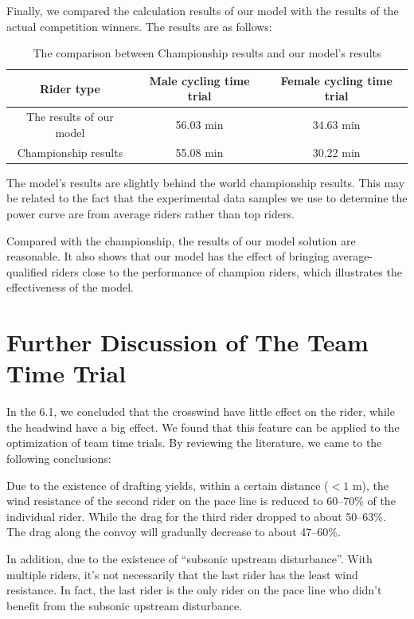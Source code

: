 \documentclass{mcmthesis}
\begin{document}
Finally, we compared the calculation results of our model with the results of the actual competition
winners. The results are as follows:
\begin{table}[H]
\centering
\caption{The comparison between Championship results and our model's results}
\label{tab:11}\vspace{-0.4cm}
\begin{tabular}{ccc}
\hline
Rider type & Male cycling time trial & Female cycling time trial \\
\hline
The results of our model & 56.03 min & 34.63 min \\
Championship results & 55.08 min & 30.22 min \\
\hline
\end{tabular}
\end{table}
\vspace{-0.4cm}
The model's results are slightly behind the world championship
 results. This may be related to the fact that the experimental 
 data samples we use to determine the power curve are from average
  riders rather than top riders.

Compared with the championship, the results of our model 
solution are reasonable. It also shows that our model has 
the effect of bringing average-qualified riders close to
 the performance of champion riders, which illustrates the
  effectiveness of the model.


\section{ Further Discussion of The Team Time Trial}
In the 6.1, we concluded that the crosswind have little effect on the rider, while the headwind have a big effect. We found that this feature can be applied to the optimization of team time trials. By reviewing the literature, we came to the following conclusions:

Due to the existence of drafting yields, within a certain distance ($<1\text{ m}$), the wind resistance of the second rider on the pace line is reduced to 60--70\% of the individual rider. While the drag for the third rider dropped to about 50--63\%. The drag along the convoy will gradually decrease to about 47--60\%.

In addition, due to the existence of ``subsonic upstream disturbance''. With multiple riders, it's not necessarily that the last rider has the least wind resistance. In fact, the last rider is the only rider on the pace line who didn't benefit from the subsonic upstream disturbance.
\end{document}
